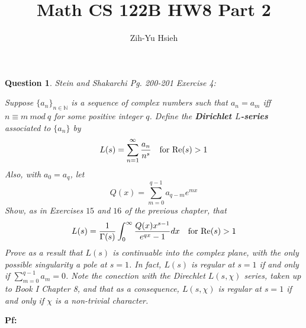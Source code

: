 \documentclass{article}
\title{Math CS 122B HW8 Part 2}
\author{Zih-Yu Hsieh}
\newtheorem{question}{Question}
\begin{document}
\maketitle

\section{}%
\begin{question}\label{q:1}
    Stein and Shakarchi Pg. 200-201 Exercise 4:

    Suppose $\{a_n\}_{n\in\mathbb{N}}$ is a sequence of complex numbers such that $a_n=a_m$ iff $n\equiv m\ mod\ q$ for some positive integer $q$. Define the \textbf{Dirichlet $L$-series} associated to $\{a_n\}$ by 
    $$L(s)=\sum_{n=1}^{\infty}\frac{a_n}{n^s}\quad \textmd{for Re}(s)>1$$
    Also, with $a_0=a_q$, let 
    $$Q(x)=\sum_{m=0}^{q-1}a_{q-m}e^{mx}$$
    Show, as in Exercises $15$ and $16$ of the previous chapter, that 
    $$L(s)=\frac{1}{\Gamma(s)}\int_{0}^{\infty}\frac{Q(x)x^{s-1}}{e^{qx}-1}dx\quad \textmd{for Re}(s)>1$$
    Prove as a result that $L(s)$ is continuable into the complex plane, with the only possible singularity a pole at $s=1$. In fact, $L(s)$ is regular at $s=1$ if and only if $\sum_{m=0}^{q-1}a_m=0$. Note the conection with the Direchlet $L(s,\chi)$ series, taken up to Book I Chapter 8, and that as a consequence, $L(s,\chi)$ is regular at $s=1$ if and only if $\chi$ is a non-trivial character.
\end{question}

\textbf{Pf:}
\end{document}
